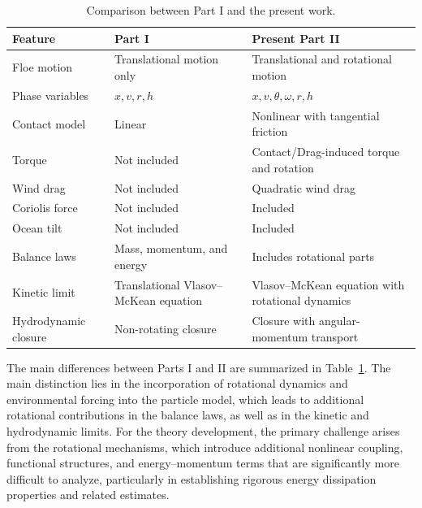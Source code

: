 \documentclass[a4paper,11pt]{article}
\numberwithin{equation}{section}
\theoremstyle{definition}
\begin{document}
\begin{table}[ht]
\centering
\small
\setlength{\tabcolsep}{4pt}
\renewcommand{\arraystretch}{1.2}

\begin{tabularx}{\textwidth}{
|>{\raggedright\arraybackslash}p{}
|>{\raggedright\arraybackslash}p{}
|>{\raggedright\arraybackslash}X|
}
\hline
Feature & Part I & Present Part II \\
\hline

Floe motion 
& Translational motion only 
& Translational and rotational motion \\
\hline

Phase variables 
& $x,v,r,h$ 
& $x,v,\theta,\omega,r,h$ \\
\hline

Contact model 
& Linear  
& Nonlinear with tangential friction \\
\hline

Torque 
& Not included 
& Contact/Drag-induced torque and rotation \\
\hline

Wind drag
& Not included 
& Quadratic wind drag \\
\hline


Coriolis force
& Not included 
& Included \\
\hline

Ocean tilt
& Not included 
& Included \\
\hline

Balance laws 
& Mass, momentum, and energy 
& Includes rotational parts \\
\hline

Kinetic limit 
& Translational Vlasov--McKean equation 
& Vlasov--McKean equation with rotational dynamics \\
\hline

Hydrodynamic closure 
& Non-rotating closure 
& Closure with angular-momentum transport \\
\hline
\end{tabularx}

\caption{Comparison between Part I and the present work.}
\label{tab:1}
\end{table}

The main differences between Parts I and II are summarized in Table~\ref{tab:1}. 
The main distinction lies in the incorporation of rotational dynamics and environmental forcing into the particle model, which leads to additional rotational contributions in the balance laws, as well as in the kinetic and hydrodynamic limits. 
For the theory development, the primary challenge arises from the rotational mechanisms, which introduce additional nonlinear coupling, functional structures, and energy–momentum terms that are significantly more difficult to analyze, particularly in establishing rigorous energy dissipation properties and related estimates.
\end{document}
